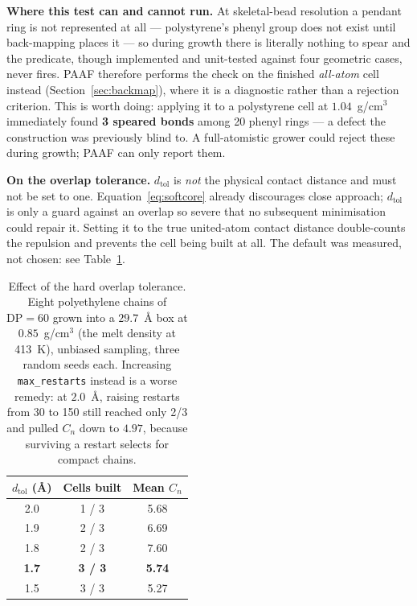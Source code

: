 \documentclass[11pt,a4paper]{article}
\begin{document}
\begin{caveat}
\textbf{Where this test can and cannot run.} At skeletal-bead resolution a
pendant ring is not represented at all --- polystyrene's phenyl group does not
exist until back-mapping places it --- so during growth there is literally
nothing to spear and the predicate, though implemented and unit-tested against
four geometric cases, never fires. PAAF therefore performs the check on the
finished \emph{all-atom} cell instead (Section~\ref{sec:backmap}), where it is
a diagnostic rather than a rejection criterion. This is worth doing: applying
it to a polystyrene cell at $1.04$~g/cm$^3$ immediately found \textbf{3
speared bonds} among 20 phenyl rings --- a defect the construction was
previously blind to. A full-atomistic grower could reject these during growth;
PAAF can only report them.
\end{caveat}

\begin{caveat}
\textbf{On the overlap tolerance.} $d_{\text{tol}}$ is \emph{not} the physical
contact distance and must not be set to one. Equation~\eqref{eq:softcore}
already discourages close approach; $d_{\text{tol}}$ is only a guard against
an overlap so severe that no subsequent minimisation could repair it. Setting
it to the true united-atom contact distance double-counts the repulsion and
prevents the cell being built at all. The default was measured, not chosen:
see Table~\ref{tab:tol}.
\end{caveat}

\begin{table}[t]
\centering
\small
\begin{tabular}{ccc}
\toprule
$d_{\text{tol}}$ (\AA) & Cells built & Mean $C_n$ \\
\midrule
2.0 & 1 / 3 & 5.68 \\
1.9 & 2 / 3 & 6.69 \\
1.8 & 2 / 3 & 7.60 \\
\textbf{1.7} & \textbf{3 / 3} & \textbf{5.74} \\
1.5 & 3 / 3 & 5.27 \\
\bottomrule
\end{tabular}
\caption{Effect of the hard overlap tolerance. Eight polyethylene chains of
$\mathrm{DP}=60$ grown into a $29.7$~\AA{} box at $0.85$~g/cm$^3$ (the melt
density at 413~K), unbiased sampling, three random seeds each. Increasing
\texttt{max\_restarts} instead is a worse remedy: at $2.0$~\AA{}, raising
restarts from 30 to 150 still reached only 2/3 and pulled $C_n$ down to
$4.97$, because surviving a restart selects for compact chains.}
\label{tab:tol}
\end{table}
\end{document}
